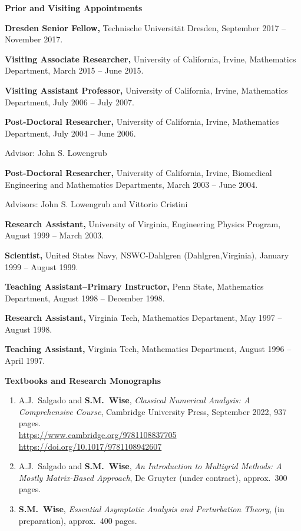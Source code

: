 \documentclass[11pt]{letter}
\begin{document}
{\LARGE\bf  Prior and Visiting Appointments}
    \begin{description}    \item 
\textbf{Dresden Senior Fellow,} Technische Universit\"{a}t Dresden, September 2017 -- November 2017.
    \item 
\textbf{Visiting Associate Researcher,} University of California, Irvine,
Mathematics Department, March 2015 -- June 2015. 
    \item 
\textbf{Visiting Assistant Professor,} University of California, Irvine,
Mathematics Department, July 2006 -- July 2007.
    \item 
\textbf{Post-Doctoral Researcher,} University of California, Irvine, Mathematics Department, July 2004 -- June 2006.
    \begin{description}
    \item
Advisor: John S. Lowengrub
    \end{description}
    	\item 
\textbf{Post-Doctoral Researcher,} University of California, Irvine, Biomedical Engineering and Mathematics Departments, March 2003 -- June 2004.
    \begin{description}
    \item
Advisors: John S. Lowengrub and Vittorio Cristini
    \end{description}
	\item
\textbf{Research Assistant,} University of Virginia, Engineering Physics Program, August 1999 -- March 2003.
    \item
\textbf{Scientist,} United States Navy, NSWC-Dahlgren (Dahlgren,Virginia), January 1999 -- August 1999.
    \item
\textbf{Teaching Assistant--Primary Instructor,} Penn State, Mathematics Department, August 1998 -- December 1998.
    \item
\textbf{Research Assistant,} Virginia Tech, Mathematics Department, May 1997 -- August 1998.
    \item
\textbf{Teaching Assistant,} Virginia Tech, Mathematics Department, August 1996 -- April 1997.
    \end{description}


{\LARGE\bf  Textbooks and Research Monographs}
    \begin{enumerate}
    \item
A.J.~Salgado and \textbf{S.M.~Wise}, {\sl Classical Numerical Analysis: A Comprehensive Course}, Cambridge University Press, September 2022, 937 pages.
	\\
\url{https://www.cambridge.org/9781108837705}
	\\
\url{https://doi.org/10.1017/9781108942607}
    \item
A.J.~Salgado and \textbf{S.M.~Wise}, {\sl An Introduction to Multigrid Methods: A Mostly Matrix-Based Approach}, De Gruyter (under contract), approx.~300 pages.
	\item
\textbf{S.M.~Wise}, {\sl Essential Asymptotic Analysis and Perturbation Theory},  (in preparation), approx.~400 pages.
    \end{enumerate}
\end{document}
